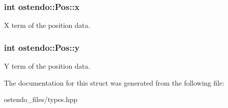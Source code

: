 \subsubsection[{\texorpdfstring{x}{x}}]{\setlength{\rightskip}{0pt plus 5cm}int ostendo\+::\+Pos\+::x}\hypertarget{structostendo_1_1Pos_a123081aea927725b236b54b208b491f7}{}\label{structostendo_1_1Pos_a123081aea927725b236b54b208b491f7}
X term of the position data. 
\subsubsection[{\texorpdfstring{y}{y}}]{\setlength{\rightskip}{0pt plus 5cm}int ostendo\+::\+Pos\+::y}\hypertarget{structostendo_1_1Pos_a896a4cd18785ab58133d2f1eeea49fab}{}\label{structostendo_1_1Pos_a896a4cd18785ab58133d2f1eeea49fab}
Y term of the position data. 

The documentation for this struct was generated from the following file\+:\begin{DoxyCompactItemize}
\item 
ostendo\+\_\+files/types.\+hpp\end{DoxyCompactItemize}
